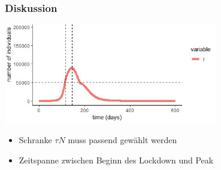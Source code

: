 \documentclass{beamer}
\begin{document}
\begin{frame}
	\frametitle{Diskussion}

	 \begin{center}
            \includegraphics[width=0.7\textwidth]{thres-I}
	\end{center}

\begin{itemize}
\item Schranke $\tau N$ muss passend gewählt werden
\item Zeitspanne zwischen Beginn des Lockdown und Peak 
\end{itemize}


\end{frame}

\end{document}
